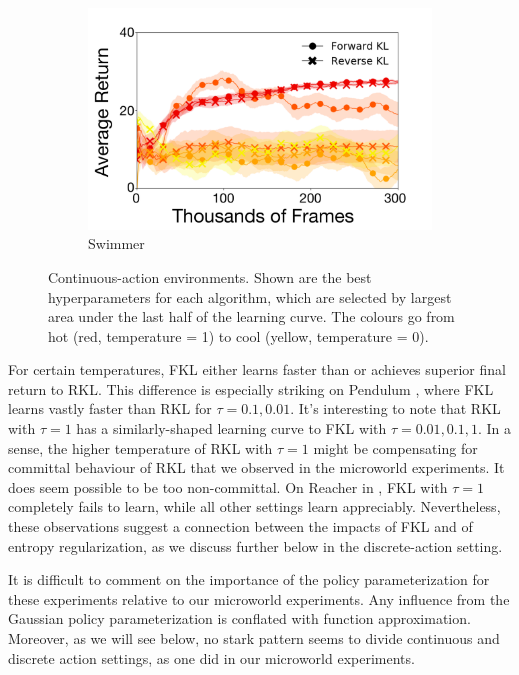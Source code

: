 \documentclass[twoside,11pt]{article}
\begin{document}
\begin{figure}[t]
  \begin{subfigure}[b]{0.5\linewidth}
    \centering
    \includegraphics[width=\columnwidth]{figs/deep/continuous/Swimmer_entropy_comparison.pdf} 
    \caption{Swimmer}\label{fig:swimmer}
  \end{subfigure}
  \caption{Continuous-action environments. Shown are the best hyperparameters for each algorithm, which are selected by largest area under the last half of the learning curve. The colours go from hot (red, temperature = 1) to cool (yellow, temperature = 0). }\label{fig_cont}
\end{figure}

For certain temperatures, FKL either learns faster than or achieves superior final return to RKL. This difference is especially striking on Pendulum , where FKL learns vastly faster than RKL for $\tau = 0.1, 0.01$. It's interesting to note that RKL with $\tau = 1$ has a similarly-shaped learning curve to FKL with $\tau = 0.01, 0.1, 1$. In a sense, the higher temperature of RKL with $\tau = 1$ might be compensating for committal behaviour of RKL that we observed in the microworld experiments. It does seem possible to be too non-committal. On Reacher in , FKL with $\tau = 1$ completely fails to learn, while all other settings learn appreciably. Nevertheless, these observations suggest a connection between the impacts of FKL and of entropy regularization, as we discuss further below in the discrete-action setting. 

It is difficult to comment on the importance of the policy parameterization for these experiments relative to our microworld experiments. Any influence from the Gaussian policy parameterization is conflated with function approximation. Moreover, as we will see below, no stark pattern seems to divide continuous and discrete action settings, as one did in our microworld experiments. 
\end{document}
